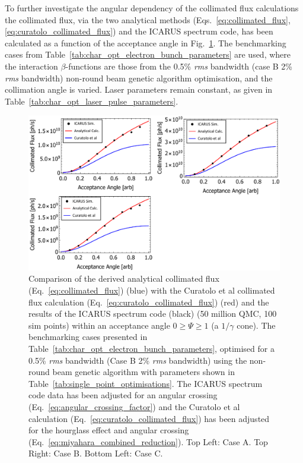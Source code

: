 \documentclass[../main.tex]{subfiles}
\begin{document}
To further investigate the angular dependency of the collimated flux calculations the collimated flux, via the two analytical methods (Eqs.~\ref{eq:collimated_flux}, \ref{eq:curatolo_collimated_flux}) and the \textsc{ICARUS} spectrum code, has been calculated as a function of the acceptance angle in Fig.~\ref{fig:curatolo_collimated_flux_comparison}. The benchmarking cases from Table~\ref{tab:char_opt_electron_bunch_parameters} are used, where the interaction $\beta$-functions are those from the 0.5\% \textit{rms} bandwidth (case B 2\% \textit{rms} bandwidth) non-round beam genetic algorithm optimisation, and the collimation angle is varied. Laser parameters remain constant, as given in Table~\ref{tab:char_opt_laser_pulse_parameters}. 
  
\begin{figure}[!h]
\centering
\includegraphics[width=\textwidth]{Figures/Optimisation_and_Characterisation_of_Inverse_Compton_Scattering_Sources/Fcol_PSI_Cases_Curatolo_Analytical_ICARUS.pdf}
\caption{Comparison of the derived analytical collimated flux (Eq.~\ref{eq:collimated_flux}) (blue) with the Curatolo et al collimated flux calculation \cite{curatolo2017analytical}  (Eq.~\ref{eq:curatolo_collimated_flux}) (red) and the results of the \textsc{ICARUS} spectrum code (black) (50 million QMC, 100 sim points) within an acceptance angle $0 \geq \Psi \geq 1$ (a $1/\gamma$ cone). The benchmarking cases presented in Table~\ref{tab:char_opt_electron_bunch_parameters}, optimised for a 0.5\% \textit{rms} bandwidth (Case B 2\% \textit{rms} bandwidth) using the non-round beam genetic algorithm with parameters shown in Table~\ref{tab:single_point_optimisations}. The \textsc{ICARUS} spectrum code data has been adjusted for an angular crossing (Eq.~\ref{eq:angular_crossing_factor}) and the Curatolo et al calculation (Eq.~\ref{eq:curatolo_collimated_flux}) has been adjusted for the hourglass effect and angular crossing (Eq.~\ref{eq:miyahara_combined_reduction}). Top Left: Case A. Top Right: Case B. Bottom Left: Case C.}
\label{fig:curatolo_collimated_flux_comparison}
\end{figure}
\end{document}
